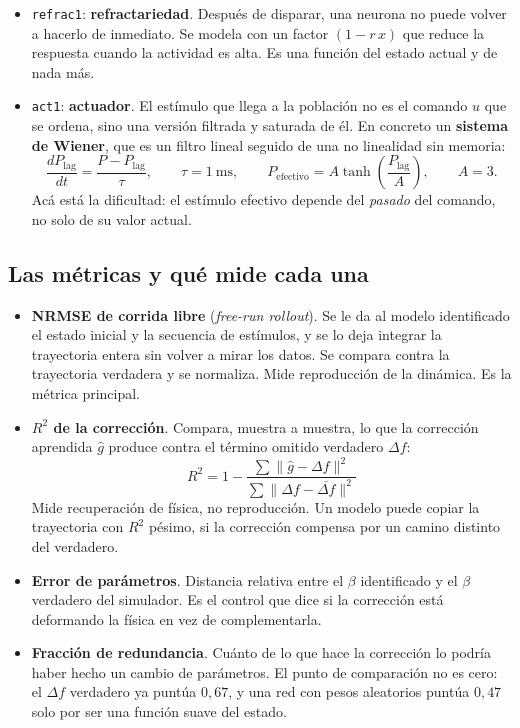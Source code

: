 \documentclass[11pt,a4paper]{article}
\newcommand{\term}[1]{\textbf{#1}}
\begin{document}
\begin{itemize}
\item \texttt{refrac1}: \term{refractariedad}. Después de disparar, una neurona
  no puede volver a hacerlo de inmediato. Se modela con un factor
  $(1 - r\,x)$ que reduce la respuesta cuando la actividad es alta. Es una
  función del estado actual y de nada más.
\item \texttt{act1}: \term{actuador}. El estímulo que llega a la población no es
  el comando $u$ que se ordena, sino una versión filtrada y saturada de él. En
  concreto un \term{sistema de Wiener}, que es un filtro lineal seguido de una
  no linealidad sin memoria:
  \begin{equation}
    \frac{dP_{\text{lag}}}{dt} = \frac{P - P_{\text{lag}}}{\tau},
    \qquad \tau = 1~\text{ms},
    \qquad P_{\text{efectivo}} = A \tanh\!\left(\frac{P_{\text{lag}}}{A}\right),
    \qquad A = 3.
  \end{equation}
  Acá está la dificultad: el estímulo efectivo depende del \emph{pasado} del
  comando, no solo de su valor actual.
\end{itemize}

\subsection{Las métricas y qué mide cada una}

\begin{itemize}
\item \term{NRMSE de corrida libre} (\emph{free-run rollout}). Se le da al
  modelo identificado el estado inicial y la secuencia de estímulos, y se lo
  deja integrar la trayectoria entera sin volver a mirar los datos. Se compara
  contra la trayectoria verdadera y se normaliza. Mide reproducción de la
  dinámica. Es la métrica principal.
\item \term{$R^2$ de la corrección}. Compara, muestra a muestra, lo que la
  corrección aprendida $\hat{g}$ produce contra el término omitido verdadero
  $\Delta f$:
  \begin{equation}
    R^2 = 1 - \frac{\sum \lVert \hat{g} - \Delta f \rVert^2}
                   {\sum \lVert \Delta f - \overline{\Delta f} \rVert^2}
  \end{equation}
  Mide recuperación de física, no reproducción. Un modelo puede copiar la
  trayectoria con $R^2$ pésimo, si la corrección compensa por un camino
  distinto del verdadero.
\item \term{Error de parámetros}. Distancia relativa entre el $\beta$
  identificado y el $\beta$ verdadero del simulador. Es el control que dice si
  la corrección está deformando la física en vez de complementarla.
\item \term{Fracción de redundancia}. Cuánto de lo que hace la corrección lo
  podría haber hecho un cambio de parámetros. El punto de comparación no es
  cero: el $\Delta f$ verdadero ya puntúa $0{,}67$, y una red con pesos
  aleatorios puntúa $0{,}47$ solo por ser una función suave del estado.
\end{itemize}
\end{document}

